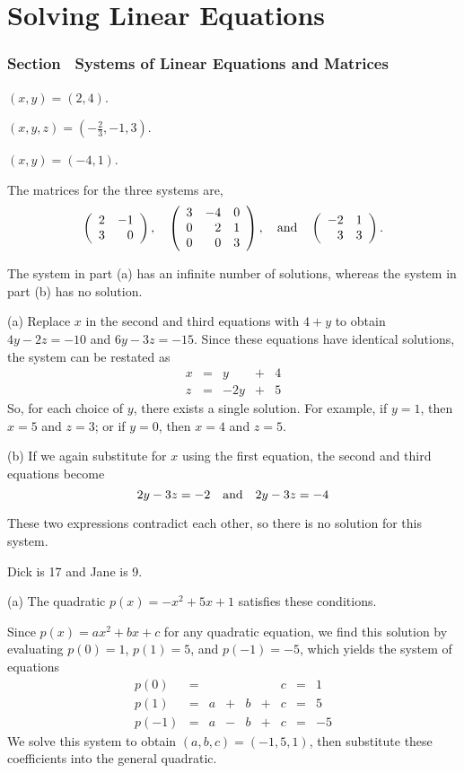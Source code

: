 \chapter{Solving Linear Equations}

\subsection*{Section~\protect{\ref{S:2.1}} Systems of Linear Equations and
Matrices}

 $(x,y) = (2,4)$.

 $(x,y,z) = (-\frac{2}{3}, -1, 3)$.

 $(x,y) = (-4,1)$.

 The matrices for the three systems are,
\[
\left(\begin{array}{rr} 2 & -1\\ 3 &0\end{array}\right), \quad
\left(\begin{array}{rrr} 3 & -4 & 0 \\ 0 & 2 & 1 \\ 0 & 0 & 3\end{array}\right), \quad\mbox{and}\quad
\left(\begin{array}{rr} -2 & 1\\ 3 &3\end{array}\right).
\]

\ans The system in part (a) has an infinite number of solutions, whereas
the system in part (b) has no solution.

\soln (a) Replace $x$ in the second and third equations with
$4 + y$ to obtain $4y - 2z = -10$ and $6y - 3z = -15$.  Since these
equations have identical solutions, the system can be restated as
\[
\begin{array}{rrrrrrr}
x & = & y & + & 4 \\ 
z & = & -2y & + & 5\end{array}
\]
So, for each choice of $y$, there exists a single solution.  For
example, if $y = 1$, then $x = 5$ and $z = 3$; or if $y = 0$, then
$x = 4$ and $z = 5$.

(b) If we again substitute for $x$ using the first equation, the
second and third equations become
\[
2y - 3z = -2 \quad\mbox{and}\quad 2y - 3z = -4
\]

These two expressions contradict each other, so there is no solution
for this system.

\newpage
{}
Dick is 17 and Jane is 9.


(a) \ans The quadratic $p(x) = -x^2 + 5x + 1$ satisfies these conditions.

\soln Since $p(x) = ax^2 + bx + c$ for any quadratic equation, we find
this solution by evaluating $p(0) = 1$, $p(1) = 5$, and $p(-1) = -5$,
which yields the system of equations
\[
\begin{array}{lrrrrrrrr}
p(0) & = & & & & & c & = & 1 \\
p(1) & = & a & + & b & + & c & = & 5 \\
p(-1) & = & a & - & b & + & c & = & -5\end{array}
\]
We solve this system to obtain $(a,b,c) = (-1,5,1)$, then substitute
these coefficients into the general quadratic.

